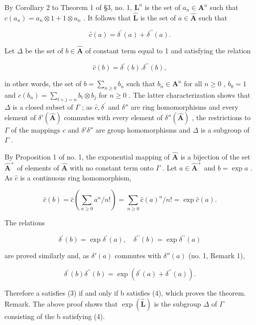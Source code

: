 By Corollary 2 to Theorem 1 of §3, no. 1, \(\mathbf{L}^n\) is the set of \(a_{n}\in \mathbf{A}^{n}\) such that \(c(a_{n}) = a_{n}\otimes 1 + 1\otimes a_{n}\) . It follows that \(\hat{\mathbf{L}}\) is the set of \(a\in \hat{\mathbf{A}}\) such that

\[
\hat {c} (a) = \delta^ {\prime} (a) + \delta^ {\prime \prime} (a).\tag{3}
\]

Let \(\Delta\) be the set of \(b\in \hat{\mathbf{A}}\) of constant term equal to 1 and satisfying the relation

\[
\hat {c} (b) = \delta^ {\prime} (b). \delta^ {\prime \prime} (b),\tag{4}
\]

in other words, the set of \(b = \sum_{n\geqslant 0}b_n\) such that \(b_{n}\in \mathbf{A}^{n}\) for all \(n\geqslant 0\) , \(b_0 = 1\) and \(c(b_{n}) = \sum_{t + j = n}b_{t}\otimes b_{j}\) for \(n\geqslant 0\) . The latter characterization shows that \(\Delta\) is a closed subset of \(\Gamma\) ; as \(\hat c,\delta^{\prime}\) and \(\delta ''\) are ring homomorphisms and every element of \(\delta'(\hat{\mathbf A})\) commutes with every element of \(\delta''(\hat{\mathbf A})\) , the restrictions to \(\Gamma\) of the mappings \(c\) and \(\delta ' \delta''\) are group homomorphisms and \(\Delta\) is a subgroup of \(\Gamma\) .

By Proposition 1 of no. 1, the exponential mapping of \(\hat{\mathbf{A}}\) is a bijection of the set \(\hat{\mathbf{A}}^{+}\) of elements of \(\hat{\mathbf{A}}\) with no constant term onto \(\Gamma\) . Let \(a \in \hat{\mathbf{A}}^{+}\) and \(b = \exp a\) . As \(\hat c\) is a continuous ring homomorphism,

\[
\hat {c} (b) = \hat {c} \left(\sum_ {n \geqslant 0} a ^ {n} / n!\right) = \sum_ {n \geqslant 0} \hat {c} (a) ^ {n} / n! = \exp \hat {c} (a).
\]

The relations

\[
\delta^ {\prime} (b) = \exp \delta^ {\prime} (a), \quad \delta^ {\prime \prime} (b) = \exp \delta^ {\prime \prime} (a)
\]

are proved similarly and, as \(\delta'(a)\) commutes with \(\delta''(a)\) (no. 1, Remark 1),

\[
\delta^ {\prime} (b) \delta^ {\prime \prime} (b) = \exp (\delta^ {\prime} (a) + \delta^ {\prime \prime} (a)).
\]

Therefore a satisfies (3) if and only if b satisfies (4), which proves the theorem. Remark. The above proof shows that \(\exp(\hat{\mathbf{L}})\) is the subgroup \(\Delta\) of \(\Gamma\) consisting of the b satisfying (4).


